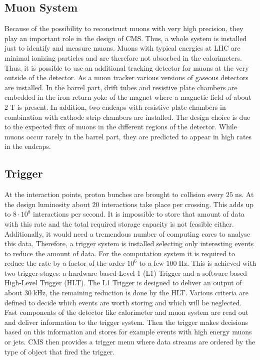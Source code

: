 \subsection{Muon System}
\label{sec:muonsystem}
	Because of the possibility to reconstruct muons with very high precision, they play an important role in the design of CMS. Thus, a whole system is installed just to identify and measure muons. Muons with typical energies at LHC are minimal ionizing particles and are therefore not absorbed in the calorimeters. Thus, it is possible to use an additional tracking detector for muons at the very outside of the detector. As a muon tracker various versions of gaseous detectors are installed. In the barrel part, drift tubes and resistive plate chambers are embedded in the iron return yoke of the magnet where a magnetic field of about $2\;\text{T}$ is present. In addition, two endcaps with resistive plate chambers in combination with cathode strip chambers are installed. The design choice is due to the expected flux of muons in the different regions of the detector. While muons occur rarely in the barrel part, they are predicted to appear in high rates in the endcaps.

\subsection{Trigger}
\label{sec:trigger}
	At the interaction points, proton bunches are brought to collision every $25\;\text{ns}$. At the design luminosity about $20$ interactions take place per crossing. This adds up to $8 \cdot 10^8$ interactions per second. It is impossible to store that amount of data with this rate and the total required storage capacity is not feasible either. Additionally, it would need a tremendous number of computing cores to analyse this data. Therefore, a trigger system is installed selecting only interesting events to reduce the amount of data. For the computation system it is required to reduce the rate by a factor of the order $10^6$ to a few $100\;\text{Hz}$. This is achieved with two trigger stages: a hardware based Level-1 (L1) Trigger \cite{L1} and a software based High-Level Trigger (HLT)\cite{HLT}. The L1 Trigger is designed to deliver an output of about $30\;\text{kHz}$, the remaining reduction is done by the HLT. Various criteria are defined to decide which events are worth storing and which will be neglected. Fast components of the detector like calorimeter and muon system are read out and deliver information to the trigger system. Then the trigger makes decisions based on this information and stores for example events with high energy muons or jets. CMS then provides a trigger menu where data streams are ordered by the type of object that fired the trigger.

	